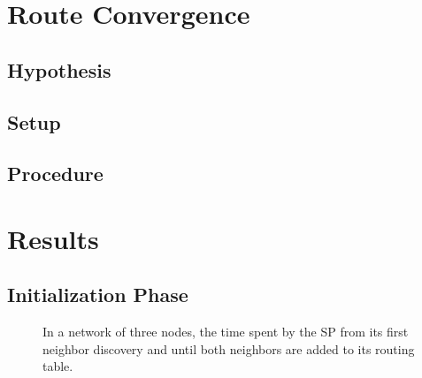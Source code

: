 \section{Route Convergence}

\subsection{Hypothesis}

\subsection{Setup}

\subsection{Procedure}



\section{Results}

\subsection{Initialization Phase}

\begin{figure}[h]
	\centering
	\caption{In a network of three nodes, the time spent by the \ac{SP} from its first neighbor discovery and until both neighbors are added to its routing table.}
	\label{fig:results_test_1}
\end{figure}


